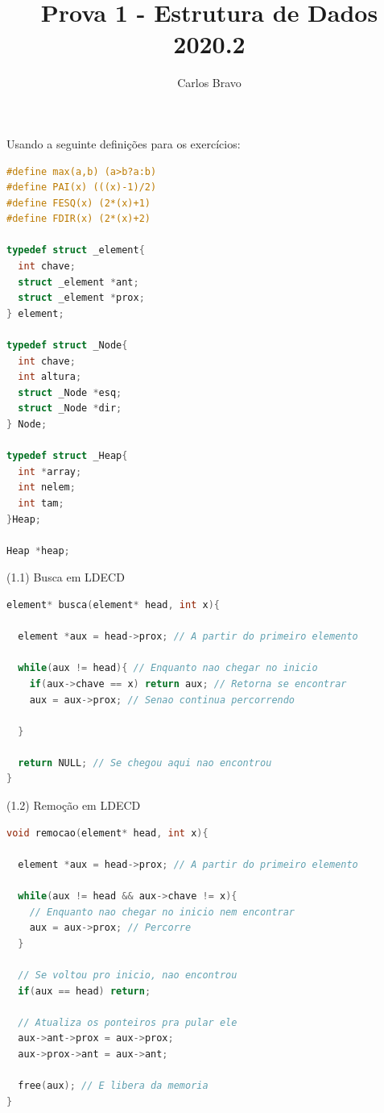 \documentclass{homework}
\title{Prova 1 - Estrutura de Dados 2020.2}
\author{Carlos Bravo}
\begin{document}
\maketitle

Usando a seguinte definições para os exercícios:
\begin{lstlisting}[language=C]
#define max(a,b) (a>b?a:b)
#define PAI(x) (((x)-1)/2)
#define FESQ(x) (2*(x)+1)
#define FDIR(x) (2*(x)+2)

typedef struct _element{
  int chave;
  struct _element *ant;
  struct _element *prox;
} element;

typedef struct _Node{
  int chave;
  int altura;
  struct _Node *esq;
  struct _Node *dir;
} Node;

typedef struct _Heap{
  int *array;
  int nelem;
  int tam;
}Heap;

Heap *heap;
\end{lstlisting}
\newpage

\exercise
(1.1) Busca em LDECD
\begin{lstlisting}[language=C]
element* busca(element* head, int x){

  element *aux = head->prox; // A partir do primeiro elemento
  
  while(aux != head){ // Enquanto nao chegar no inicio
    if(aux->chave == x) return aux; // Retorna se encontrar
    aux = aux->prox; // Senao continua percorrendo
  
  }
  
  return NULL; // Se chegou aqui nao encontrou
}
\end{lstlisting}
(1.2) Remoção em LDECD
\begin{lstlisting}[language=C]
void remocao(element* head, int x){

  element *aux = head->prox; // A partir do primeiro elemento
  
  while(aux != head && aux->chave != x){
    // Enquanto nao chegar no inicio nem encontrar
    aux = aux->prox; // Percorre
  }
  
  // Se voltou pro inicio, nao encontrou
  if(aux == head) return;
  
  // Atualiza os ponteiros pra pular ele
  aux->ant->prox = aux->prox; 
  aux->prox->ant = aux->ant;
  
  free(aux); // E libera da memoria
}
\end{lstlisting}
\end{document}
